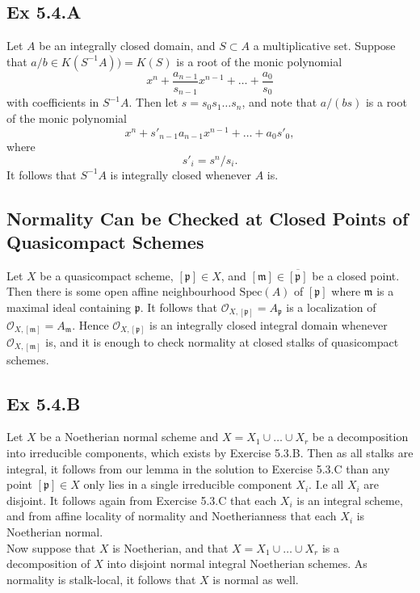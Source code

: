 \documentclass{article}
\theoremstyle{definition}
\newcommand{\oo}{\mathcal{O}}
\newcommand{\Spec}{\text{Spec}}
\begin{document}
\subsection*{Ex 5.4.A}

Let $A$ be an integrally closed domain, and $S \subset A$ a multiplicative set.
Suppose that $a/b \in K(S^{-1}A)) = K(S)$ is a root of the monic polynomial 
\[
	x^n + \frac{a_{n-1}}{s_{n-1}} x^{n-1} + \ldots + \frac{a_0}{s_0}
\]
with coefficients in $S^{-1}A$. Then let $s = s_0s_1\ldots s_n$,
and note that $a/(bs)$ is a root of the monic polynomial
\[
	x^n + s'_{n-1} a_{n-1} x^{n-1} + \ldots + a_0s'_0,
\]
where
\[
	s'_i
	=
	s^n/s_i.
\] 
It follows that $S^{-1}A$ is integrally closed whenever $A$ is.


\subsection*{Normality Can be Checked at Closed Points of Quasicompact Schemes}

Let $X$ be a quasicompact scheme, $[\mathfrak{p}] \in X$, and $[\mathfrak{m}]
\in \overline{[\mathfrak{p}]}$ be a closed point. Then there is some open
affine neighbourhood $\Spec(A)$ of $[\mathfrak{p}]$ where $\mathfrak{m}$ is a
maximal ideal containing $\mathfrak{p}$. It follows that $\oo_{X,
[\mathfrak{p}]} = A_{\mathfrak{p}}$ is a localization of $\oo_{X,
[\mathfrak{m}]} = A_{\mathfrak{m}}$. Hence $\oo_{X, [\mathfrak{p}]}$ is an
integrally closed integral domain whenever $\oo_{X, [\mathfrak{m}]}$ is, and it
is enough to check normality at closed stalks of quasicompact schemes.


\subsection*{Ex 5.4.B}

Let $X$ be a Noetherian normal scheme and $X = X_1 \cup \ldots \cup X_r$ be a
decomposition into irreducible components, which exists by Exercise 5.3.B. Then
as all stalks are integral, it follows from our lemma in the solution to
Exercise 5.3.C than any point $[\mathfrak{p}] \in X$ only lies in a single
irreducible component $X_i$. I.e all $X_i$ are disjoint. It follows again from
Exercise 5.3.C that each $X_i$ is an integral scheme, and from affine locality
of normality and Noetherianness that each $X_i$ is Noetherian normal. \\

Now suppose that $X$ is Noetherian, and that $X = X_1 \cup \ldots \cup X_r$ is
a decomposition of $X$ into disjoint normal integral Noetherian schemes. As
normality is stalk-local, it follows that $X$ is normal as well.
\end{document}
